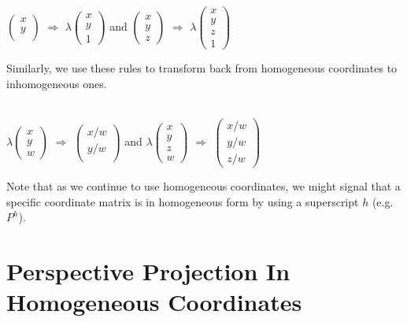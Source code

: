 \documentclass[]{article}
\begin{document}
\begin{center}
$\begin{pmatrix}
x \\
y \\
\end{pmatrix}
$
$\Rightarrow$
$\lambda\begin{pmatrix}
x \\
y \\
1
\end{pmatrix}
$
and
$\begin{pmatrix}
x \\
y \\
z
\end{pmatrix}
$
$\Rightarrow$
$\lambda\begin{pmatrix}
x \\
y \\
z \\
1
\end{pmatrix}
$
\end{center}
Similarly, we use these rules to transform back from homogeneous coordinates to inhomogeneous ones. \\\\
\begin{center}
$\lambda\begin{pmatrix}
x \\
y \\
w
\end{pmatrix}
$
$\Rightarrow$
$\begin{pmatrix}
x/w \\
y/w \\
\end{pmatrix}
$
and
$\lambda\begin{pmatrix}
x \\
y \\
z \\
w
\end{pmatrix}
$
$\Rightarrow$
$\begin{pmatrix}
x/w \\
y/w \\
z/w
\end{pmatrix}
$
\end{center}
Note that as we continue to use homogeneous coordinates, we might signal that a specific coordinate matrix is in homogeneous form by using a superscript $h$ (e.g. $P^h$).



\section{Perspective Projection In Homogeneous Coordinates}
\end{document}

